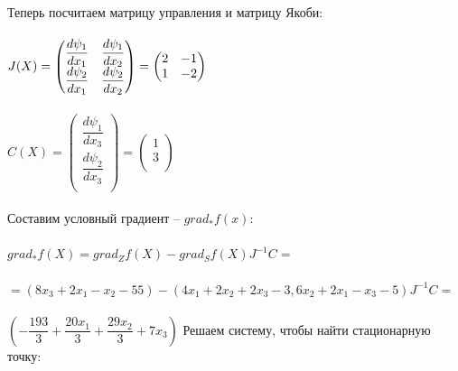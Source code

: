 \documentclass[14pt,a4paper,fleqn]{extarticle}
\begin{document}
	Теперь посчитаем матрицу управления и матрицу Якоби:\\\\
	$J(X) = \begin{pmatrix}
			\dfrac{d\psi_1}{dx_1} & \dfrac{d\psi_1}{dx_2}\\
			\dfrac{d\psi_2}{dx_1} & \dfrac{d\psi_2}{dx_2}\\
		\end{pmatrix} =
		\begin{pmatrix}
			2 & -1\\
			1 & -2\\
		\end{pmatrix}\\
	$\\\\
	$C(X) = \begin{pmatrix}
			\dfrac{d\psi_1}{dx_3}\\
			\dfrac{d\psi_2}{dx_3}\\
		\end{pmatrix} =
		\begin{pmatrix}
			1\\
			3\\
		\end{pmatrix}$\\\\
	Составим условный градиент -- $grad_* f(x)$:\\\\
	$grad_* f(X) = grad_Z f(X) - grad_S f(X) J^{-1} C =$\\\\
	$= (8x_3 + 2x_1 - x_2 - 55) - (4x_1 + 2x_2 + 2x_3 - 3, 6x_2 + 2x_1 - x_3 - 5) J^{-1} C =$\\\\
	$(-\dfrac{193}{3} + \dfrac{20x_1}{3} + \dfrac{29x_2}{3} + 7x_3)$
	\newpage
	Решаем систему, чтобы найти стационарную точку:\\\\
		\\\\
	
\end{document}
